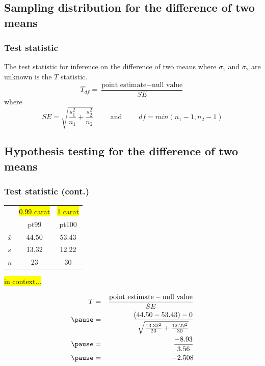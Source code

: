
\subsection{Sampling distribution for the difference of two means}


\begin{frame}
\frametitle{Test statistic}

{The test statistic for inference on the difference of two means where $\sigma_1$ and $\sigma_2$ are unknown is the $T$ statistic.
\[ T_{df} = \frac{\text{point estimate} - \text{null value}}{SE} \]
where 
\[ SE = \sqrt{ \frac{s_1^2}{n_1} + \frac{s_2^2}{n_2} } \qquad \text{ and } \qquad df = min(n_1 - 1, n_2 - 1) \]
}


\end{frame}


\subsection{Hypothesis testing for the difference of two means}


\begin{frame}
\frametitle{Test statistic (cont.)}

{\small
\begin{center}
\begin{tabular}{l | c | c}
		& {\footnotesize \hl{0.99 carat}} &  {\footnotesize \hl{1 carat}}  \\
		& pt99	& pt100 \\
\hline
$\bar{x}$	& 44.50		& 53.43 \\
$s$		& 13.32		& 12.22 \\
$n$		& 23			& 30
\end{tabular}
\end{center}
}

\hl{in context...}

\pause

{\small
\begin{eqnarray*}
T &=& \frac{\text{point estimate} - \text{null value} }{SE} \\
\pause
&=& \frac{(44.50 - 53.43) - 0}{ \sqrt{\frac{13.32^2}{23} + \frac{12.22^2}{30} }} \\
\pause
&=& \frac{-8.93}{3.56} \\
\pause
&=& -2.508
\end{eqnarray*}
}

\end{frame}

